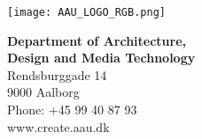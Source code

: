 

{}
\thispagestyle{empty}

\begin{minipage}{0.55\textwidth}
	\texttt{[image: AAU\_LOGO\_RGB.png]}
\end{minipage}
\begin{minipage}{0.35\textwidth}
{ \textbf{\small Department of Architecture,}}\\
{ \textbf{\small Design and Media Technology}}\\
{\small  Rendsburggade 14} \\
{\small 9000 Aalborg} \\
{\small Phone: +45 99 40 87 93} \\
{\small  www.create.aau.dk}
\end{minipage}

\vspace*{1cm}

